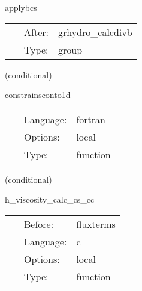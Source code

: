 \documentclass{article}
\begin{document}
\hspace{5mm} applybcs 

\hspace{5mm}{\it apply boundary conditions to divb } 


\hspace{5mm}

 \begin{tabular*}{160mm}{cll} 
~ & After:  & grhydro\_calcdivb \\ 
~ & Type:  & group \\ 
\end{tabular*} 


\vspace{5mm}

   (conditional) 

\hspace{5mm} constrainsconto1d 

\hspace{5mm}{\it constrain conserved fluid velocity to radial direction } 


\hspace{5mm}

 \begin{tabular*}{160mm}{cll} 
~ & Language:  & fortran \\ 
~ & Options:  & local \\ 
~ & Type:  & function \\ 
\end{tabular*} 


\vspace{5mm}

   (conditional) 

\hspace{5mm} h\_viscosity\_calc\_cs\_cc 

\hspace{5mm}{\it compute local temporaries for h viscosity - c++ version } 


\hspace{5mm}

 \begin{tabular*}{160mm}{cll} 
~ & Before:  & fluxterms \\ 
~ & Language:  & c \\ 
~ & Options:  & local \\ 
~ & Type:  & function \\ 
\end{tabular*} 


\vspace{5mm}
\end{document}

